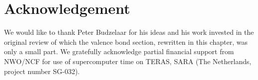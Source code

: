 \section*{Acknowledgement}
We would like to thank Peter Budzelaar for his ideas and his work invested in the original review \cite{budzelaar} of which the valence bond section, rewritten in this chapter, was only a small part. We gratefully acknowledge partial financial support from NWO/NCF for use of supercomputer time on TERAS, SARA (The Netherlands, project number SG-032).  



